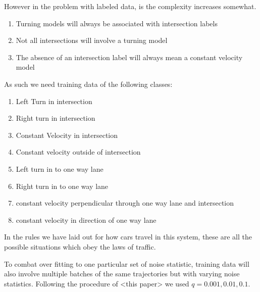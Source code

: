 \documentclass[twocolumn,letterpaper]{IEEEAerospaceCLS}  %
\begin{document}
However in the problem with labeled data, is the complexity increases somewhat.

\begin{enumerate}
\item Turning models will always be associated with intersection labels
\item Not all intersections will involve a turning model
\item The absence of an intersection label will always mean a constant velocity model
\end{enumerate}

As such we need training data of the following classes:

\begin{enumerate}
\item Left Turn in intersection
\item Right turn in intersection
\item Constant Velocity in intersection
\item Constant velocity outside of intersection
\item Left turn in to one way lane
\item Right turn in to one way lane
\item constant velocity perpendicular through one way lane and intersection
\item constant velocity in direction of one way lane
\end{enumerate}

In the rules we have laid out for how cars travel in this system, these are all the possible situations which obey the laws of traffic.

To combat over fitting to one particular set of noise statistic, training data will also involve multiple batches of the same trajectories but with varying noise statistics. Following the procedure of <this paper> we used $q=0.001, 0.01, 0.1$.
\end{document}
